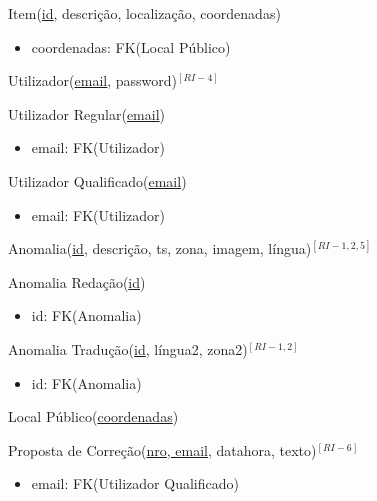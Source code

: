 \documentclass[12pt]{report}
\begin{document}
\begin{multicols}{2}
Item(\underline{id}, descrição, localização, coordenadas)
    \begin{itemize}
    \item coordenadas: FK(Local Público)
    \end{itemize}

\vspace{5mm}

Utilizador(\underline{email}, password)$^{[RI-4]}$

\vspace{5mm}

Utilizador Regular(\underline{email})
    \begin{itemize}
    \item email: FK(Utilizador)
    \end{itemize}


Utilizador Qualificado(\underline{email})
    \begin{itemize}
    \item email: FK(Utilizador)
    \end{itemize}

\vspace{5mm}



Anomalia(\underline{id}, descrição, ts, zona, imagem, língua)$^{[RI-1,2,5]}$


Anomalia Redação(\underline{id})
    \begin{itemize}
    \item id: FK(Anomalia)
    \end{itemize}


Anomalia Tradução(\underline{id}, língua2, zona2)$^{[RI-1,2]}$
    \begin{itemize}
    \item id: FK(Anomalia)
    \end{itemize}


\vspace{5mm}


Local Público(\underline{coordenadas})

\vspace{5mm}

Proposta de Correção(\underline{nro, email}, datahora, texto)$^{[RI-6]}$
    \begin{itemize}
	    \item email: FK(Utilizador Qualificado)
    \end{itemize}




\end{multicols}
\end{document}
